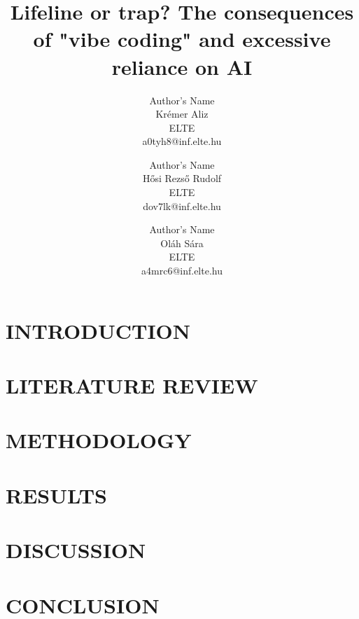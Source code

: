 \documentclass[10pt]{article}
\title{\textbf{ Lifeline or trap? The consequences of "vibe coding" and excessive reliance on AI }}
\author{
    \fontsize{11}{13}\selectfont 
    1\ts{st} Author's Name \\
    \fontsize{10}{11}\selectfont 
    Krémer Aliz\\
    \fontsize{10}{11}\selectfont 
    ELTE\\
    \fontsize{10}{11}\selectfont
    a0tyh8@inf.elte.hu\\
    \and
    \fontsize{11}{13}\selectfont 
    2\ts{nd} Author's Name\\
    \fontsize{10}{11}
    \selectfont Hősi Rezső Rudolf\\
    \fontsize{10}{11}\selectfont 
    ELTE\\
    \fontsize{10}{11}\selectfont
    dov7lk@inf.elte.hu\\
     \and
    \fontsize{11}{13}\selectfont 
    3\ts{nd} Author's Name\\
    \fontsize{10}{11}
    \selectfont Oláh Sára\\
    \fontsize{10}{11}\selectfont 
   ELTE\\
    \fontsize{10}{11}\selectfont
    a4mrc6@inf.elte.hu\\
}
\date{}
\begin{document}
\renewcommand{\abstractname}{} %


\maketitle %



\setlength{\absleftindent}{0em}
\setlength{\absrightindent}{0em}

\begin{abstract}
    
\end{abstract}


\section{INTRODUCTION}


\section{LITERATURE REVIEW}


\section{METHODOLOGY}


\section{RESULTS}


\section{DISCUSSION}


\section{CONCLUSION}





\end{document}
